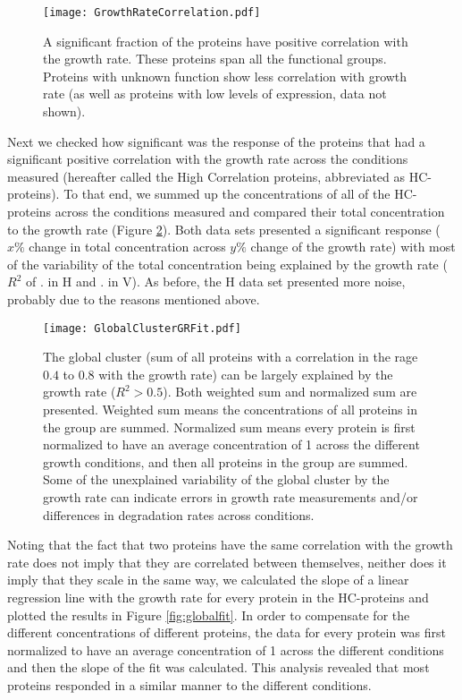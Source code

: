 \documentclass[notitlepage]{article}
\begin{document}
\begin{figure}[h]
\centering
\texttt{[image: GrowthRateCorrelation.pdf]}
\caption{
A significant fraction of the proteins have positive correlation with the growth rate.
These proteins span all the functional groups.
Proteins with unknown function show less correlation with growth rate (as well as proteins with low levels of expression, data not shown).
}
\label{fig:growthcorr}
\end{figure}

Next we checked how significant was the response of the proteins that had a significant positive correlation with the growth rate across the conditions measured (hereafter called the High Correlation proteins, abbreviated as HC-proteins).
To that end, we summed up the concentrations of all of the HC-proteins across the conditions measured and compared their total concentration to the growth rate (Figure \ref{fig:globalgrcorr}).
Both data sets presented a significant response ($x\% $ change in total concentration across $y\% $ change of the growth rate) with most of the variability of the total concentration being explained by the growth rate ($R^2$ of . in H and . in V). 
As before, the H data set presented more noise, probably due to the reasons mentioned above.

\begin{figure}[h]
\centering
\texttt{[image: GlobalClusterGRFit.pdf]}
\caption{
The global cluster (sum of all proteins with a correlation in the rage $0.4$ to $0.8$ with the growth rate) can be largely explained by the growth rate ($R^2>0.5$).
Both weighted sum and normalized sum are presented.
Weighted sum means the concentrations of all proteins in the group are summed.
Normalized sum means every protein is first normalized to have an average concentration of 1 across the different growth conditions, and then all proteins in the group are summed.
Some of the unexplained variability of the global cluster by the growth rate can indicate errors in growth rate measurements and/or differences in degradation rates across conditions.
}
\label{fig:globalgrcorr}
\end{figure}

Noting that the fact that two proteins have the same correlation with the growth rate does not imply that they are correlated between themselves, neither does it imply that they scale in the same way, we calculated the slope of a linear regression line with the growth rate for every protein in the HC-proteins and plotted the results in Figure \ref{fig:globalfit}.
In order to compensate for the different concentrations of different proteins, the data for every protein was first normalized to have an average concentration of 1 across the different conditions and then the slope of the fit was calculated.
This analysis revealed that most proteins responded in a similar manner to the different conditions.
\end{document}

